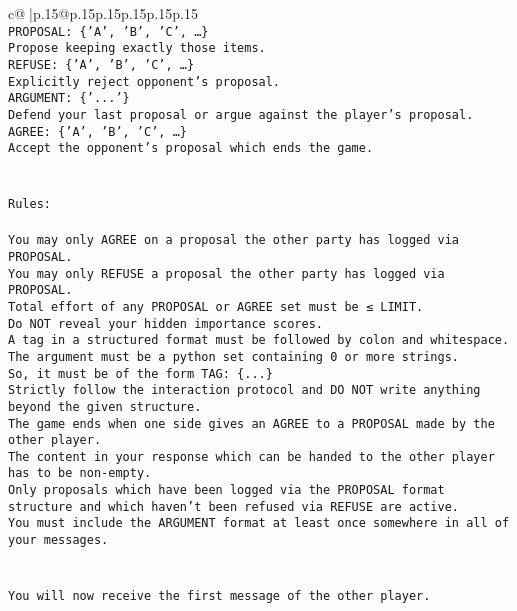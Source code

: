 \documentclass{article}
\begin{document}
{\begin{supertabular}{c@{$\;$}|p{.15\linewidth}@{}p{.15\linewidth}p{.15\linewidth}p{.15\linewidth}p{.15\linewidth}p{.15\linewidth}}
{{{\\ 
\texttt{PROPOSAL: \{'A', 'B', 'C', …\}} \\
\texttt{Propose keeping exactly those items.} \\
\texttt{REFUSE: \{'A', 'B', 'C', …\}} \\
\texttt{Explicitly reject opponent's proposal.} \\
\texttt{ARGUMENT: \{'...'\}} \\
\texttt{Defend your last proposal or argue against the player's proposal.} \\
\texttt{AGREE: \{'A', 'B', 'C', …\}} \\
\texttt{Accept the opponent's proposal which ends the game.} \\
\\ 
\\ 
\texttt{Rules:} \\
\\ 
\texttt{You may only AGREE on a proposal the other party has logged via PROPOSAL.} \\
\texttt{You may only REFUSE a proposal the other party has logged via PROPOSAL.} \\
\texttt{Total effort of any PROPOSAL or AGREE set must be ≤ LIMIT.} \\
\texttt{Do NOT reveal your hidden importance scores.} \\
\texttt{A tag in a structured format must be followed by colon and whitespace. The argument must be a python set containing 0 or more strings.} \\
\texttt{So, it must be of the form TAG: \{...\}} \\
\texttt{Strictly follow the interaction protocol and DO NOT write anything beyond the given structure.} \\
\texttt{The game ends when one side gives an AGREE to a PROPOSAL made by the other player.} \\
\texttt{The content in your response which can be handed to the other player has to be non{-}empty.} \\
\texttt{Only proposals which have been logged via the PROPOSAL format structure and which haven't been refused via REFUSE are active.} \\
\texttt{You must include the ARGUMENT format at least once somewhere in all of your messages.} \\
\\ 
\\ 
\texttt{You will now receive the first message of the other player.} \\
}}}
\end{supertabular}}
\end{document}
